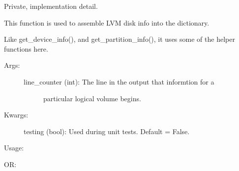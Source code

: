 \documentclass[letterpaper,10pt,english]{sphinxmanual}
\begin{document}
\begin{fulllineitems}
\label{\detokenize{linux:getdevinfo.linux.assemble_lvm_disk_info}}
Private, implementation detail.

This function is used to assemble LVM disk info into the dictionary.

Like get\_device\_info(), and get\_partition\_info(), it uses some of the
helper functions here.
\begin{description}
\item[{Args:}] \leavevmode\begin{description}
\item[{line\_counter (int):   The line in the output that informtion for a}] \leavevmode
particular logical volume begins.

\end{description}

\item[{Kwargs:}] \leavevmode
testing (bool):       Used during unit tests. Default = False.

\end{description}

Usage:

\begin{sphinxVerbatim}[commandchars=\\\{\}]
\end{sphinxVerbatim}

OR:

\begin{sphinxVerbatim}[commandchars=\\\{\}]
 
\end{sphinxVerbatim}

\end{fulllineitems}

\end{document}
